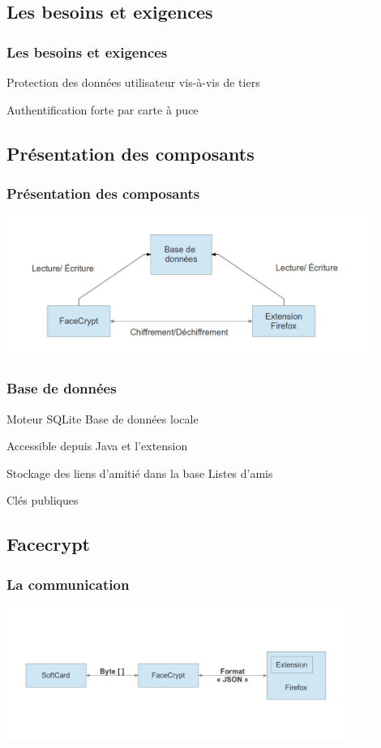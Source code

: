 \documentclass{beamer}
\begin{document}
\subsection{Les besoins et exigences}
\begin{frame}
    \frametitle{Les besoins et exigences}
    \begin{block}{}

        Protection des données utilisateur vis-à-vis de tiers

        Authentification forte par carte à puce 
    \end{block}
\end{frame}

\subsection{Présentation des composants}
\begin{frame}
    \frametitle{Présentation des composants}
    \includegraphics[width=12cm]{schema_zako}
\end{frame}


\begin{frame}
    \frametitle{Base de données}
    \begin{block}{Moteur SQLite }
        Base de données locale

        Accessible depuis Java et l'extension 
    \end{block}
    \begin{block}{Stockage des liens d'amitié dans la base}
        Listes d'amis


        Clés publiques


    \end{block}
\end{frame}


\subsection{Facecrypt}
\begin{frame}
    \frametitle{La communication}
    \includegraphics[width=11cm]{schema_dolby}
\end{frame}
\end{document}
